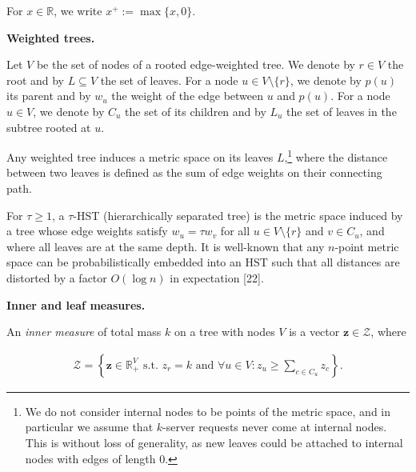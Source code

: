 \documentclass[10pt,a4paper]{article}
\begin{document}
For $x\in\mathbb{R}$, we write $x^{+}:=\max\{x,0\}$.\par




\par\medskip\noindent\textbf{Weighted trees.}\par




Let $V$ be the set of nodes of a rooted edge-weighted tree. We denote by $r\in V$ the root and by $L\subseteq V$ the set of leaves. For a node $u\in V\setminus\{r\}$, we denote by $p(u)$ its parent and by $w_{u}$ the weight of the edge between $u$ and $p(u)$.
For a node $u\in V$, we denote by $C_{u}$ the set of its children and by $L_{u}$ the set of leaves in the subtree rooted at $u$.\par




Any weighted tree induces a metric space on its leaves $L$,\footnote{We do not consider internal nodes to be points of the metric space, and in particular we assume that $k$-server requests never come at internal nodes. This is without loss of generality, as new leaves could be attached to internal nodes with edges of length $0$.} where the distance between two leaves is defined as the sum of edge weights on their connecting path.\par




For $\tau\geq 1$, a $\tau$-HST (hierarchically separated tree) is the metric space induced by a tree whose edge weights satisfy $w_{u}=\tau w_{v}$ for all $u\in V\setminus\{r\}$ and $v\in C_{u}$, and where all leaves are at the same depth. It is well-known that any $n$-point metric space can be probabilistically embedded into an HST such that all distances are distorted by a factor $O(\log n)$ in expectation [22].\par





\par\medskip\noindent\textbf{Inner and leaf measures.}\par




An \emph{inner measure} of total mass $k$ on a tree with nodes $V$ is a vector ${\mathbf{z}}\in\mathcal{Z}$, where\par


\[\begin{gathered}
\mathcal{Z}=\left\{{\mathbf{z}}\in\mathbb{R}_{+}^{V}\text{ s.t. }z_{r}=k\text{ and }\forall u\in V\colon z_{u}\geq\sum_{c\in C_{u}}z_{c}\right\}.
\end{gathered}\]
\end{document}
